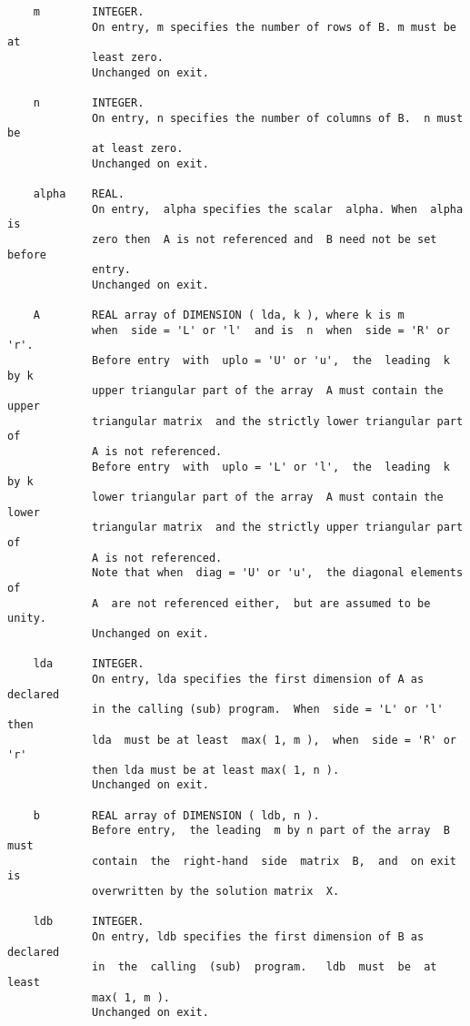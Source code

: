 \documentclass[10pt]{book}
\begin{document}
\begin{verbatim}
    m        INTEGER.
             On entry, m specifies the number of rows of B. m must be at
             least zero.
             Unchanged on exit.
   
    n        INTEGER.
             On entry, n specifies the number of columns of B.  n must be
             at least zero.
             Unchanged on exit.
   
    alpha    REAL.
             On entry,  alpha specifies the scalar  alpha. When  alpha is
             zero then  A is not referenced and  B need not be set before
             entry.
             Unchanged on exit.
   
    A        REAL array of DIMENSION ( lda, k ), where k is m
             when  side = 'L' or 'l'  and is  n  when  side = 'R' or 'r'.
             Before entry  with  uplo = 'U' or 'u',  the  leading  k by k
             upper triangular part of the array  A must contain the upper
             triangular matrix  and the strictly lower triangular part of
             A is not referenced.
             Before entry  with  uplo = 'L' or 'l',  the  leading  k by k
             lower triangular part of the array  A must contain the lower
             triangular matrix  and the strictly upper triangular part of
             A is not referenced.
             Note that when  diag = 'U' or 'u',  the diagonal elements of
             A  are not referenced either,  but are assumed to be  unity.
             Unchanged on exit.
   
    lda      INTEGER.
             On entry, lda specifies the first dimension of A as declared
             in the calling (sub) program.  When  side = 'L' or 'l'  then
             lda  must be at least  max( 1, m ),  when  side = 'R' or 'r'
             then lda must be at least max( 1, n ).
             Unchanged on exit.
   
    b        REAL array of DIMENSION ( ldb, n ).
             Before entry,  the leading  m by n part of the array  B must
             contain  the  right-hand  side  matrix  B,  and  on exit  is
             overwritten by the solution matrix  X.
	   
    ldb      INTEGER.
             On entry, ldb specifies the first dimension of B as declared
             in  the  calling  (sub)  program.   ldb  must  be  at  least
             max( 1, m ).
             Unchanged on exit. 
\end{verbatim}

\newpage
\end{document}
